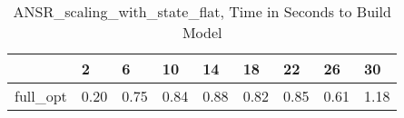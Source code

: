 \begin{table}
\caption{ANSR\_scaling\_with\_state\_flat, Time in Seconds to Build Model}
\label{ANSR_scaling_with_state_flat_model_time}
\begin{tabular}{lllllllll}
\toprule
 & 2 & 6 & 10 & 14 & 18 & 22 & 26 & 30 \\
\midrule
full\_opt & 0.20 & 0.75 & 0.84 & 0.88 & 0.82 & 0.85 & 0.61 & 1.18 \\
\bottomrule
\end{tabular}
\end{table}
